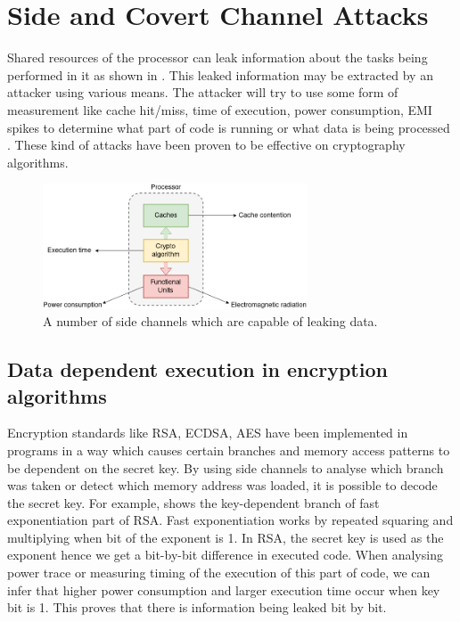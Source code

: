 \chapter{Side and Covert Channel Attacks}

Shared resources of the processor can leak information about the tasks
being performed in it as shown in .
This leaked information may be extracted by an attacker using
various means. The attacker will try to use some form of measurement like
cache hit/miss, time of execution, power consumption, EMI spikes to determine what part of
code is running or what data is being processed . These kind of attacks have been proven
to be effective on cryptography algorithms.


\begin{figure}[h]
    \centering
    \includegraphics[width=0.7\textwidth]{side_channel.png}
    \caption[Data leakage sources]{A number of side channels which are capable of leaking data.}
    \label{fig:dls}
\end{figure}

\section{Data dependent execution in encryption algorithms}

Encryption standards like RSA, ECDSA, AES have been implemented in programs in a way
which causes certain branches and memory access patterns to be dependent on the secret key.
By using side channels to analyse which branch was taken or detect which memory address was loaded,
it is possible to decode the secret key. For example,  shows the key-dependent branch
of fast exponentiation part of RSA. Fast exponentiation works by repeated squaring and multiplying
when bit of the exponent is 1. In RSA, the secret key is used as the exponent hence we get
a bit-by-bit difference in executed code.
When analysing power trace or measuring timing of the execution of
this part of code, we can infer that higher power consumption and larger execution time occur
when key bit is 1. This proves that there is information being leaked bit by bit.

